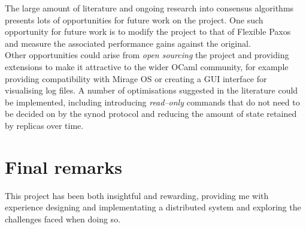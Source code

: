 The large amount of literature and ongoing research into consensus algorithms presents lots of opportunities for future work on the project. One such opportunity for future work is to modify the project to that of Flexible Paxos and measure the associated performance gains against the original. \\

Other opportunities could arise from \emph{open sourcing} the project and providing extensions to make it attractive to the wider OCaml community, for example providing compatibility with Mirage OS \cite{Madhavapeddy:2013:ULO:2499368.2451167} or creating a GUI interface for visualising log files. A number of optimisations suggested in the literature could be implemented, including introducing \emph{read--only} commands that do not need to be decided on by the synod protocol and reducing the amount of state retained by replicas over time.

\section{Final remarks}

This project has been both insightful and rewarding, providing me with experience designing and implementating a distributed system and exploring the challenges faced when doing so. \\